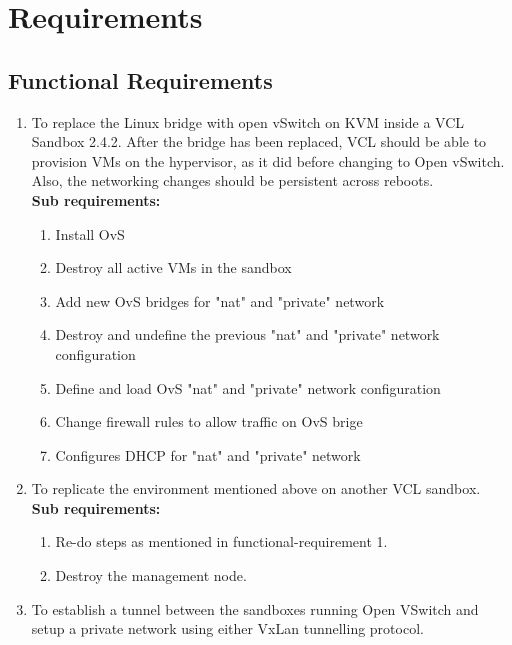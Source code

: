 \documentclass[12pt]{extarticle}
\begin{document}

\section{Requirements}
\subsection{Functional Requirements}
\begin{enumerate}
    \item To replace the Linux bridge with open vSwitch on KVM inside a VCL Sandbox 2.4.2. After the bridge has been replaced, VCL should be able to provision VMs on the hypervisor, as it did before changing to Open vSwitch. Also, the networking changes should be persistent across reboots.
    \\
    \textbf{Sub requirements:}
    \begin{enumerate}   
        \item Install OvS
        \item Destroy all active VMs in the sandbox
        \item Add new OvS bridges for "nat" and "private" network
        \item Destroy and undefine the previous "nat" and "private" network configuration
        \item Define and load OvS "nat" and "private" network configuration
        \item Change firewall rules to allow traffic on OvS brige
        \item Configures DHCP for "nat" and "private" network
        
    \end{enumerate}

    \item To replicate the environment mentioned above on another VCL sandbox. 
    \\
    \textbf{Sub requirements:}
    \begin{enumerate}   
        \item Re-do steps as mentioned in functional-requirement 1.
        \item Destroy the management node.
    \end{enumerate}
    
    \item To establish a tunnel between the sandboxes running Open VSwitch and setup a private network using either VxLan tunnelling protocol.


\end{enumerate}
\end{document}
